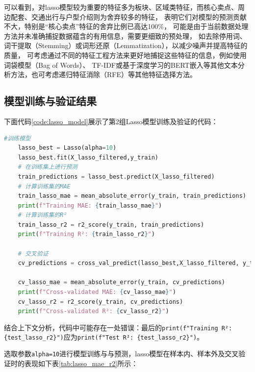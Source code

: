 \documentclass[
    report,     %
    oneside,    %
    UTF8,       %
    zihao=-4    %
]{config} %
\begin{document}
可以看到，对lasso模型较为重要的特征多为板块、区域类特征，而核心卖点、周边配套、交通出行与户型介绍则为舍弃较多的特征，
表明它们对模型的预测贡献不大，特别是“核心卖点”特征的舍弃比例已高达100\%，
可能是由于当前数据处理方法并未准确捕捉数据蕴含的有用信息，需要更细致的预处理，
如去除停用词、词干提取（Stemming）或词形还原（Lemmatization），以减少噪声并提高特征的质量，
可考虑通过不同的特征工程方法来更好地捕捉这些特征的信息，例如使用词袋模型（Bag of Words）、
TF-IDF或基于深度学习的BERT嵌入等其他文本分析方法，也可考虑递归特征消除（RFE）等其他特征选择方法。

\subsection{模型训练与验证结果}
下面代码\ref{code:lasso_model}展示了第2组Lasso模型训练及验证的代码：
\begin{lstlisting}[label=code:lasso_model, language=Python, caption=Lasso模型训练]
    #训练模型
    lasso_best = Lasso(alpha=10)
    lasso_best.fit(X_lasso_filtered,y_train)
    # 在训练集上进行预测  
    train_predictions = lasso_best.predict(X_lasso_filtered)  
    # 计算训练集的MAE
    train_lasso_mae = mean_absolute_error(y_train, train_predictions)  
    print(f"Training MAE: {train_lasso_mae}")  
    # 计算训练集的R²  
    train_lasso_r2 = r2_score(y_train, train_predictions)  
    print(f"Training R²: {train_lasso_r2}")

    # 交叉验证
    cv_predictions = cross_val_predict(lasso_best,X_lasso_filtered, y_train, cv=6)  

    cv_lasso_mae = mean_absolute_error(y_train, cv_predictions)  
    print(f"Cross-validated MAE: {cv_lasso_mae}")   
    cv_lasso_r2 = r2_score(y_train, cv_predictions)  
    print(f"Cross-validated R²: {cv_lasso_r2}")
\end{lstlisting}

结合上下文分析，代码中可能存在一处错误：最后的\lstinline|print(f"Training R²: {test_lasso_r2}")|应为\lstinline|print(f"Test R²: {test_lasso_r2}")|。

选取参数\lstinline{alpha=10}进行模型训练与与预测，lasso模型在样本内、样本外及交叉验证时的表现如下表\ref{tab:lasso_mae_r2}所示：
\begin{table}[htbp]
    \centering
    \caption{Lasso模型在样本内、样本外及交叉验证时的表现}
    \label{tab:lasso_mae_r2}
\end{table}
\end{document}
